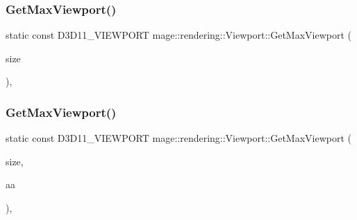 \hypertarget{classmage_1_1rendering_1_1_viewport_a9a931b51974ac4cd2d93aac2c0e10a09}{}\label{classmage_1_1rendering_1_1_viewport_a9a931b51974ac4cd2d93aac2c0e10a09} 
\subsubsection{\texorpdfstring{Get\+Max\+Viewport()}{GetMaxViewport()}\hspace{0.1cm}{\footnotesize\ttfamily [1/2]}}
{\footnotesize\ttfamily static const D3\+D11\+\_\+\+V\+I\+E\+W\+P\+O\+RT mage\+::rendering\+::\+Viewport\+::\+Get\+Max\+Viewport (\begin{DoxyParamCaption}\item[{const \hyperlink{namespacemage_a88e05bff0300120c013285d3dcad95c5}{U32x2} \&}]{size }\end{DoxyParamCaption})\hspace{0.3cm}{\ttfamily [static]}, {\ttfamily [noexcept]}}

\hypertarget{classmage_1_1rendering_1_1_viewport_ac971d4f062cf37e3a5a2a57640a13da4}{}\label{classmage_1_1rendering_1_1_viewport_ac971d4f062cf37e3a5a2a57640a13da4} 
\subsubsection{\texorpdfstring{Get\+Max\+Viewport()}{GetMaxViewport()}\hspace{0.1cm}{\footnotesize\ttfamily [2/2]}}
{\footnotesize\ttfamily static const D3\+D11\+\_\+\+V\+I\+E\+W\+P\+O\+RT mage\+::rendering\+::\+Viewport\+::\+Get\+Max\+Viewport (\begin{DoxyParamCaption}\item[{const \hyperlink{namespacemage_a88e05bff0300120c013285d3dcad95c5}{U32x2} \&}]{size,  }\item[{\hyperlink{namespacemage_1_1rendering_ac3f75e49e92b42f2f5fb55c450d8899c}{Anti\+Aliasing}}]{aa }\end{DoxyParamCaption})\hspace{0.3cm}{\ttfamily [static]}, {\ttfamily [noexcept]}}


